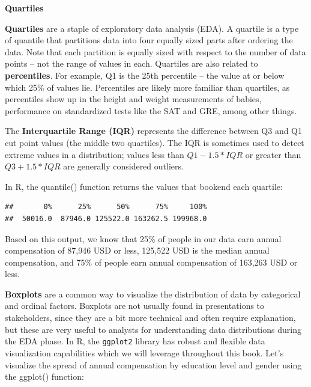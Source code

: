 \documentclass[]{book}
\newenvironment{Shaded}{\begin{snugshade}}{\end{snugshade}}
\newcommand{\CommentTok}[1]{\textcolor[rgb]{0.56,0.35,0.01}{\textit{#1}}}
\newcommand{\KeywordTok}[1]{\textcolor[rgb]{0.13,0.29,0.53}{\textbf{#1}}}
\newcommand{\NormalTok}[1]{#1}
\newcommand{\OperatorTok}[1]{\textcolor[rgb]{0.81,0.36,0.00}{\textbf{#1}}}
\begin{document}
\textbf{Quartiles}

\textbf{Quartiles} are a staple of exploratory data analysis (EDA). A quartile is a type of quantile that partitions data into four equally sized parts after ordering the data. Note that each partition is equally sized with respect to the number of data points -- not the range of values in each. Quartiles are also related to \textbf{percentiles}. For example, Q1 is the 25th percentile -- the value at or below which 25\% of values lie. Percentiles are likely more familiar than quartiles, as percentiles show up in the height and weight measurements of babies, performance on standardized tests like the SAT and GRE, among other things.

The \textbf{Interquartile Range (IQR)} represents the difference between Q3 and Q1 cut point values (the middle two quartiles). The IQR is sometimes used to detect extreme values in a distribution; values less than \(Q1 - 1.5 * IQR\) or greater than \(Q3 + 1.5 * IQR\) are generally considered outliers.

In R, the quantile() function returns the values that bookend each quartile:

\begin{Shaded}
\end{Shaded}

\begin{verbatim}
##       0%      25%      50%      75%     100% 
##  50016.0  87946.0 125522.0 163262.5 199968.0
\end{verbatim}

Based on this output, we know that 25\% of people in our data earn annual compensation of 87,946 USD or less, 125,522 USD is the median annual compensation, and 75\% of people earn annual compensation of 163,263 USD or less.

\textbf{Boxplots} are a common way to visualize the distribution of data by categorical and ordinal factors. Boxplots are not usually found in presentations to stakeholders, since they are a bit more technical and often require explanation, but these are very useful to analysts for understanding data distributions during the EDA phase. In R, the \texttt{ggplot2} library has robust and flexible data visualization capabilities which we will leverage throughout this book. Let's visualize the spread of annual compensation by education level and gender using the ggplot() function:
\end{document}
